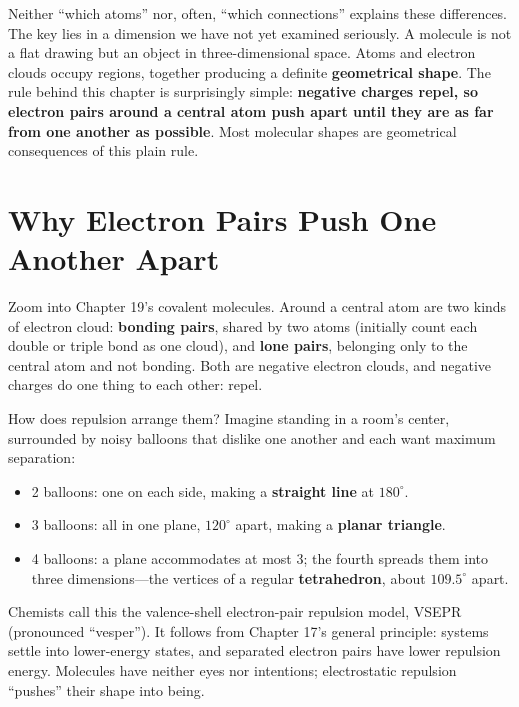 Neither ``which atoms'' nor, often, ``which connections'' explains these differences. The key lies in a dimension we have not yet examined seriously. A molecule is not a flat drawing but an object in three-dimensional space. Atoms and electron clouds occupy regions, together producing a definite \textbf{geometrical shape}. The rule behind this chapter is surprisingly simple: \textbf{negative charges repel, so electron pairs around a central atom push apart until they are as far from one another as possible}. Most molecular shapes are geometrical consequences of this plain rule.

\section{Why Electron Pairs Push One Another Apart}

Zoom into Chapter 19's covalent molecules. Around a central atom are two kinds of electron cloud: \textbf{bonding pairs}, shared by two atoms (initially count each double or triple bond as one cloud), and \textbf{lone pairs}, belonging only to the central atom and not bonding. Both are negative electron clouds, and negative charges do one thing to each other: repel.

How does repulsion arrange them? Imagine standing in a room's center, surrounded by noisy balloons that dislike one another and each want maximum separation:

\begin{itemize}[itemsep=2pt]
\item 2 balloons: one on each side, making a \textbf{straight line} at $180^{\circ}$.
\item 3 balloons: all in one plane, $120^{\circ}$ apart, making a \textbf{planar triangle}.
\item 4 balloons: a plane accommodates at most 3; the fourth spreads them into three dimensions---the vertices of a regular \textbf{tetrahedron}, about $109.5^{\circ}$ apart.
\end{itemize}

Chemists call this the valence-shell electron-pair repulsion model, VSEPR (pronounced ``vesper''). It follows from Chapter 17's general principle: systems settle into lower-energy states, and separated electron pairs have lower repulsion energy. Molecules have neither eyes nor intentions; electrostatic repulsion ``pushes'' their shape into being.

